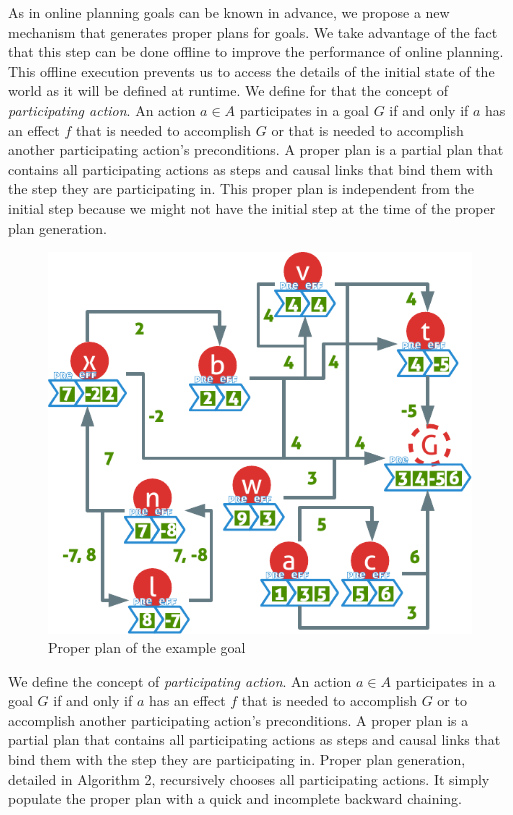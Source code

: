 \documentclass[]{article}
\begin{document}
As in online planning goals can be known in advance, we propose a new
mechanism that generates proper plans for goals. We take advantage of
the fact that this step can be done offline to improve the performance
of online planning. This offline execution prevents us to access the
details of the initial state of the world as it will be defined at
runtime. We define for that the concept of \emph{participating action}.
An action \(a \in A\) participates in a goal \(G\) if and only if \(a\)
has an effect \(f\) that is needed to accomplish \(G\) or that is needed
to accomplish another participating action's preconditions. A proper
plan is a partial plan that contains all participating actions as steps
and causal links that bind them with the step they are participating in.
This proper plan is independent from the initial step because we might
not have the initial step at the time of the proper plan generation.

\begin{figure}[htbp]
\centering
\includegraphics{graphics/proper.pdf}
\caption{Proper plan of the example goal\label{fig:proper}}
\end{figure}

We define the concept of \emph{participating action}. An action
\(a \in A\) participates in a goal \(G\) if and only if \(a\) has an
effect \(f\) that is needed to accomplish \(G\) or to accomplish another
participating action's preconditions. A proper plan is a partial plan
that contains all participating actions as steps and causal links that
bind them with the step they are participating in. Proper plan
generation, detailed in Algorithm 2, recursively chooses all
participating actions. It simply populate the proper plan with a quick
and incomplete backward chaining.
\end{document}
